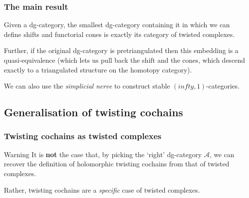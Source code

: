\documentclass{beamer}
\begin{document}
        \begin{frame}\frametitle{The main result}
            \begin{theorem}
                Given a dg-category, the smallest dg-category containing it in which we can define shifts and functorial cones is exactly its category of twisted complexes.

                \pause

                Further, if the original dg-category is pretriangulated then this embedding is a quasi-equivalence (which lets us pull back the shift and the cones, which descend exactly to a triangulated structure on the homotopy category).

                \pause

                We can also use the \emph{simplicial nerve} to construct stable $(infty,1)$-categories.
            \end{theorem}
        \end{frame}
    
    \subsection{Generalisation of twisting cochains}

        \begin{frame}\frametitle{Twisting cochains as twisted complexes}
            \begin{alertblock}{Warning}
                It is \textbf{not} the case that, by picking the `right' dg-category $\mathcal{A}$, we can recover the definition of holomorphic twisting cochains from that of twisted complexes.

                \pause

                Rather, twisting cochains are a \emph{specific} case of twisted complexes.
            \end{alertblock}
        \end{frame}
\end{document}
